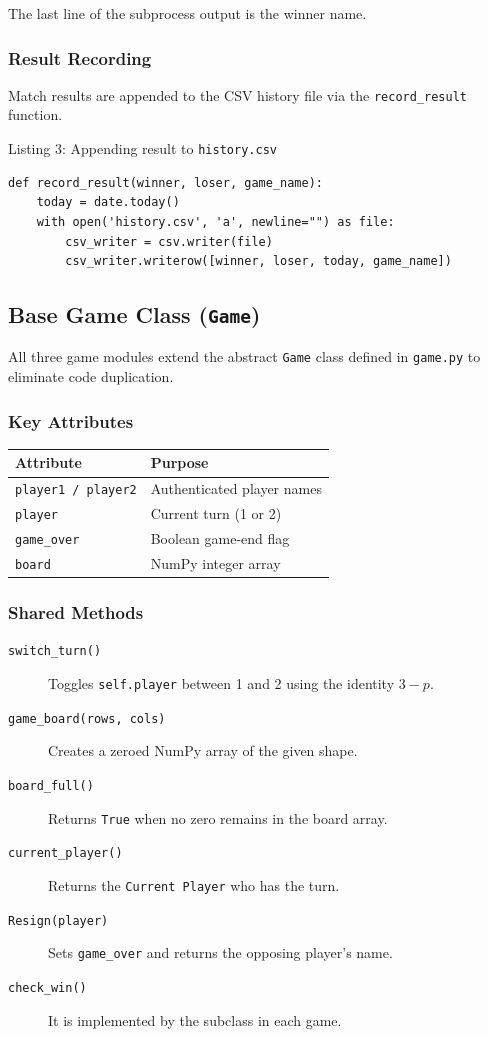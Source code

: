 \documentclass[12pt]{article}
\begin{document}
The last line of the subprocess output is the winner name.

\subsubsection*{Result Recording}
Match results are appended to the CSV history file via the \texttt{record\_result} function.
\begin{center}
Listing 3: Appending result to \texttt{history.csv}
\end{center}
\begin{lstlisting}[style=pythonstyle]
def record_result(winner, loser, game_name):
    today = date.today()
    with open('history.csv', 'a', newline="") as file:
        csv_writer = csv.writer(file)
        csv_writer.writerow([winner, loser, today, game_name])
\end{lstlisting}
\subsection{Base Game Class (\texttt{Game})}
All three game modules extend the abstract \texttt{Game} class defined in \texttt{game.py} to eliminate code duplication.

\subsubsection*{Key Attributes}
\begin{center}
\begin{tabular}{ll}
\toprule
\textbf{Attribute} & \textbf{Purpose} \\ \midrule
\texttt{player1 / player2} & Authenticated player names \\
\texttt{player} & Current turn (1 or 2) \\
\texttt{game\_over} & Boolean game-end flag \\
\texttt{board} & NumPy integer array \\
 \bottomrule
\end{tabular}
\end{center}

\subsubsection*{Shared Methods}
\begin{description}
    \item[\texttt{switch\_turn()}]  Toggles \texttt{self.player} between 1 and 2 using the identity $3 - p$.
    \item[\texttt{game\_board(rows, cols)}]  Creates a zeroed NumPy array of the given shape.
    \item[\texttt{board\_full()}] Returns \texttt{True} when no zero remains in the board array.
    \item[\texttt{current\_player()}] Returns the \texttt{Current Player} who has the turn.
    \item[\texttt{Resign(player)}] Sets \texttt{game\_over} and returns the opposing player's name.
    \item[\texttt{check\_win()}] It is implemented by the subclass in each game.
\end{description}
\end{document}

